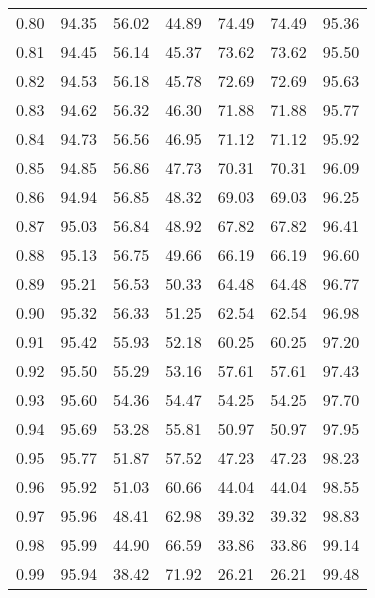 \begin{tabular}{|c|c|c|c|c|c|c|}
      0.80 &     94.35 &     56.02 &      44.89 &   74.49 &      74.49 &         95.36 \\
      0.81 &     94.45 &     56.14 &      45.37 &   73.62 &      73.62 &         95.50 \\
      0.82 &     94.53 &     56.18 &      45.78 &   72.69 &      72.69 &         95.63 \\
      0.83 &     94.62 &     56.32 &      46.30 &   71.88 &      71.88 &         95.77 \\
      0.84 &     94.73 &     56.56 &      46.95 &   71.12 &      71.12 &         95.92 \\
      0.85 &     94.85 &     56.86 &      47.73 &   70.31 &      70.31 &         96.09 \\
      0.86 &     94.94 &     56.85 &      48.32 &   69.03 &      69.03 &         96.25 \\
      0.87 &     95.03 &     56.84 &      48.92 &   67.82 &      67.82 &         96.41 \\
      0.88 &     95.13 &     56.75 &      49.66 &   66.19 &      66.19 &         96.60 \\
      0.89 &     95.21 &     56.53 &      50.33 &   64.48 &      64.48 &         96.77 \\
      0.90 &     95.32 &     56.33 &      51.25 &   62.54 &      62.54 &         96.98 \\
      0.91 &     95.42 &     55.93 &      52.18 &   60.25 &      60.25 &         97.20 \\
      0.92 &     95.50 &     55.29 &      53.16 &   57.61 &      57.61 &         97.43 \\
      0.93 &     95.60 &     54.36 &      54.47 &   54.25 &      54.25 &         97.70 \\
      0.94 &     95.69 &     53.28 &      55.81 &   50.97 &      50.97 &         97.95 \\
      0.95 &     95.77 &     51.87 &      57.52 &   47.23 &      47.23 &         98.23 \\
      0.96 &     95.92 &     51.03 &      60.66 &   44.04 &      44.04 &         98.55 \\
      0.97 &     95.96 &     48.41 &      62.98 &   39.32 &      39.32 &         98.83 \\
      0.98 &     95.99 &     44.90 &      66.59 &   33.86 &      33.86 &         99.14 \\
      0.99 &     95.94 &     38.42 &      71.92 &   26.21 &      26.21 &         99.48 \\
\bottomrule
\end{tabular}
